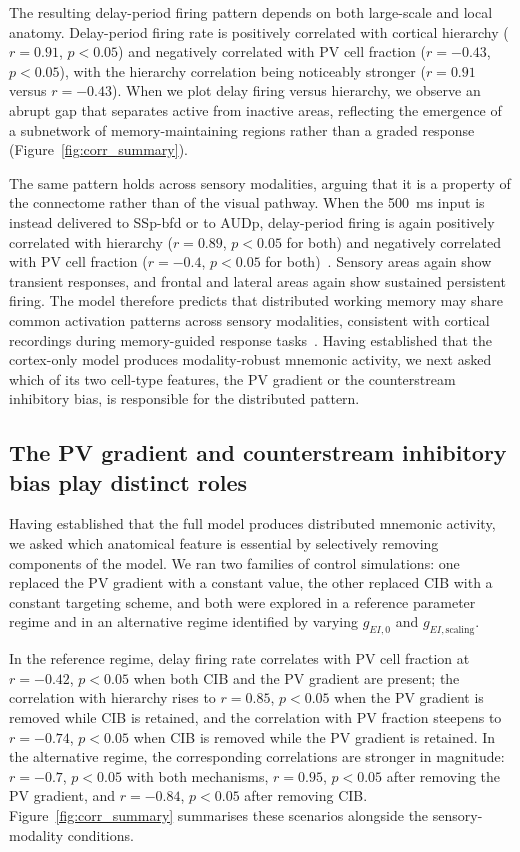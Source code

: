\documentclass[11pt]{article}
\begin{document}
The resulting delay-period firing pattern depends on both large-scale and local anatomy. Delay-period firing rate is positively correlated with cortical hierarchy ($r=0.91$, $p<0.05$) and negatively correlated with PV cell fraction ($r=-0.43$, $p<0.05$), with the hierarchy correlation being noticeably stronger ($r=0.91$ versus $r=-0.43$). When we plot delay firing versus hierarchy, we observe an abrupt gap that separates active from inactive areas, reflecting the emergence of a subnetwork of memory-maintaining regions rather than a graded response (Figure~\ref{fig:corr_summary}).

The same pattern holds across sensory modalities, arguing that it is a property of the connectome rather than of the visual pathway. When the 500~ms input is instead delivered to SSp-bfd or to AUDp, delay-period firing is again positively correlated with hierarchy ($r=0.89$, $p<0.05$ for both) and negatively correlated with PV cell fraction ($r=-0.4$, $p<0.05$ for both)~\cite{gilad2018behavioral}. Sensory areas again show transient responses, and frontal and lateral areas again show sustained persistent firing. The model therefore predicts that distributed working memory may share common activation patterns across sensory modalities, consistent with cortical recordings during memory-guided response tasks~\cite{gilad2018behavioral}. Having established that the cortex-only model produces modality-robust mnemonic activity, we next asked which of its two cell-type features, the PV gradient or the counterstream inhibitory bias, is responsible for the distributed pattern.

\subsection{The PV gradient and counterstream inhibitory bias play distinct roles}

Having established that the full model produces distributed mnemonic activity, we asked which anatomical feature is essential by selectively removing components of the model. We ran two families of control simulations: one replaced the PV gradient with a constant value, the other replaced CIB with a constant targeting scheme, and both were explored in a reference parameter regime and in an alternative regime identified by varying $g_{EI,0}$ and $g_{EI,\text{scaling}}$.

In the reference regime, delay firing rate correlates with PV cell fraction at $r=-0.42$, $p<0.05$ when both CIB and the PV gradient are present; the correlation with hierarchy rises to $r=0.85$, $p<0.05$ when the PV gradient is removed while CIB is retained, and the correlation with PV fraction steepens to $r=-0.74$, $p<0.05$ when CIB is removed while the PV gradient is retained. In the alternative regime, the corresponding correlations are stronger in magnitude: $r=-0.7$, $p<0.05$ with both mechanisms, $r=0.95$, $p<0.05$ after removing the PV gradient, and $r=-0.84$, $p<0.05$ after removing CIB. Figure~\ref{fig:corr_summary} summarises these scenarios alongside the sensory-modality conditions.
\end{document}
